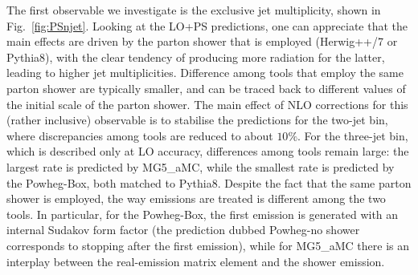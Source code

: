 The first observable we investigate is the exclusive jet multiplicity, shown in Fig.~\ref{fig:PSnjet}. Looking at the LO+PS predictions, one can appreciate that the
main effects are driven by the parton shower that is employed ({\sc Herwig++/7} or {\sc Pythia8}), with the clear tendency of producing more radiation for the latter,
leading to higher jet multiplicities. Difference among tools that employ the same parton shower are typically smaller, and can be traced back to different values of the
initial scale of the parton shower. The main effect of NLO corrections for this (rather inclusive) observable is to stabilise the predictions for the two-jet bin, where discrepancies
among tools are reduced to about $10\%$. For the three-jet bin, which is described only at LO accuracy, differences among tools remain large: the largest rate is predicted by
{\sc MG5\_aMC}, while the smallest rate is predicted by the {\sc Powheg-Box}, both matched to {\sc Pythia8}. Despite the fact that the same parton shower is employed, the way emissions are treated
is different among the two tools. In particular, for the {\sc Powheg-Box}, the first emission is generated with an internal Sudakov form factor (the
prediction dubbed {\sc Powheg-no shower} corresponds to stopping after the first emission), while for {\sc MG5\_aMC} there is an
interplay between the real-emission matrix element and the shower emission.

